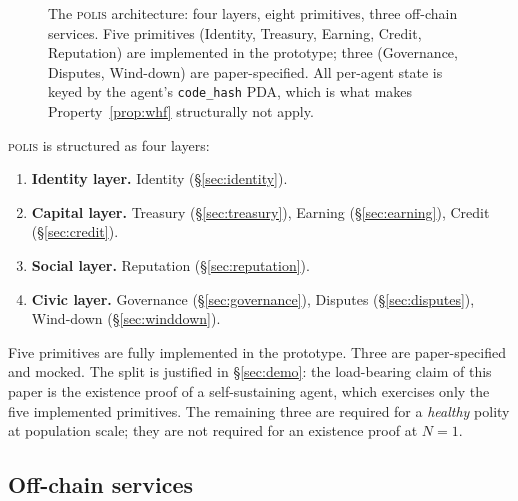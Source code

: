 \documentclass[10pt,conference,letterpaper]{IEEEtran}
\theoremstyle{definition}
\newcommand{\polis}{\textsc{polis}\xspace}
\newcommand{\codehash}{\texttt{code\_hash}}
\begin{document}
\begin{figure}[!t]
\caption{The \polis architecture: four layers, eight primitives, three
off-chain services. Five primitives (Identity, Treasury, Earning,
Credit, Reputation) are implemented in the prototype; three
(Governance, Disputes, Wind-down) are paper-specified. All
per-agent state is keyed by the agent's \codehash{} PDA, which is
what makes Property~\ref{prop:whf} structurally not apply.}
\label{fig:arch}
\end{figure}

\polis is structured as four layers:

\begin{enumerate}
\item \textbf{Identity layer.} Identity (\S\ref{sec:identity}).
\item \textbf{Capital layer.} Treasury (\S\ref{sec:treasury}), Earning
(\S\ref{sec:earning}), Credit (\S\ref{sec:credit}).
\item \textbf{Social layer.} Reputation (\S\ref{sec:reputation}).
\item \textbf{Civic layer.} Governance (\S\ref{sec:governance}),
Disputes (\S\ref{sec:disputes}), Wind-down (\S\ref{sec:winddown}).
\end{enumerate}

Five primitives are fully implemented in the prototype. Three are
paper-specified and mocked. The split is justified in
\S\ref{sec:demo}: the load-bearing claim of this paper is the
existence proof of a self-sustaining agent, which exercises only the
five implemented primitives. The remaining three are required for a
\emph{healthy} polity at population scale; they are not required for
an existence proof at $N=1$.

\subsection{Off-chain services}
\end{document}
